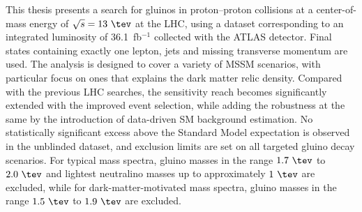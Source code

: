 This thesis presents a search for gluinos in proton–proton collisions at a center-of-mass energy of $\sqrt{s} = 13\ \tev$ at the LHC, 
using a dataset corresponding to an integrated luminosity of 36.1~fb$^{-1}$ collected with the ATLAS detector.
Final states containing exactly one lepton, jets and missing transverse momentum are used.
The analysis is designed to cover a variety of MSSM scenarios, with particular focus on ones that explains the dark matter relic density.
Compared with the previous LHC searches, the sensitivity reach becomes significantly extended with the improved event selection, while adding the robustness at the same by the introduction of data-driven SM background estimation.
%
No statistically significant excess above the Standard Model expectation is observed in the unblinded dataset, and exclusion limits are set on all targeted gluino decay scenarios. 
For typical mass spectra, gluino masses in the range $1.7\ \tev$ to $2.0\ \tev$ and lightest neutralino masses up to approximately $1\ \tev$ are excluded, 
while for dark-matter-motivated mass spectra, gluino masses in the range $1.5\ \tev$ to $1.9\ \tev$ are excluded.

\clearpage






%
